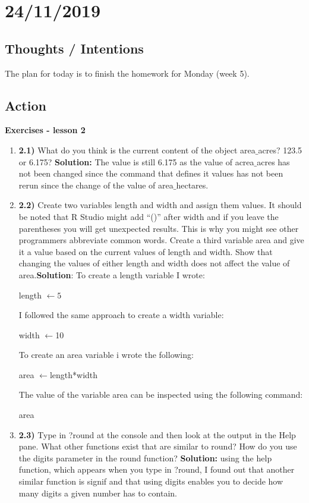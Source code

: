 \documentclass{article}
\begin{document}
\section{24/11/2019}
\subsection{Thoughts / Intentions}
The plan for today is to finish the homework for Monday (week 5).

\subsection{Action}
\textbf{Exercises - lesson 2} \newline
\begin{enumerate}
    \item \textbf{2.1)} What do you think is the current content of the object area$\_$acres?  123.5 or 6.175? \textbf{Solution:} The value is still 6.175 as the value of acrea$\_$acres has not been changed since the command that defines it values has not been rerun since the change of the value of area$\_$hectares.
    \item \textbf{2.2) }Create two variables length and width and assign them values. It should be noted that R Studio might add “()” after width and if you leave the parentheses you will get unexpected results. This is why you might see other programmers abbreviate common words. Create a third variable area and give it a value based on the current values of length and width. Show that changing the values of either length and width does not affect the value of area.\textbf{Solution}: To create a length variable I wrote:
        \begin{center}
             length $\leftarrow 5$
        \end{center}
    I followed the same approach to create a width variable:
        \begin{center}
            width $\leftarrow$10
        \end{center}
    To create an area variable i wrote the following:
        \begin{center}
            area $\leftarrow$length*width 
        \end{center}
    The value of the variable area can be inspected using the following command:
        \begin{center}
            area 
        \end{center}
    \item \textbf{2.3) }Type in ?round at the console and then look at the output in the Help pane. What other functions exist that are similar to round? How do you use the digits parameter in the round function? \textbf{Solution: }using the help function, which appears when you type in ?round, I found out that another similar function is signif and that using digits enables you to decide how many digits a given number has to contain.

\end{enumerate}
\end{document}
